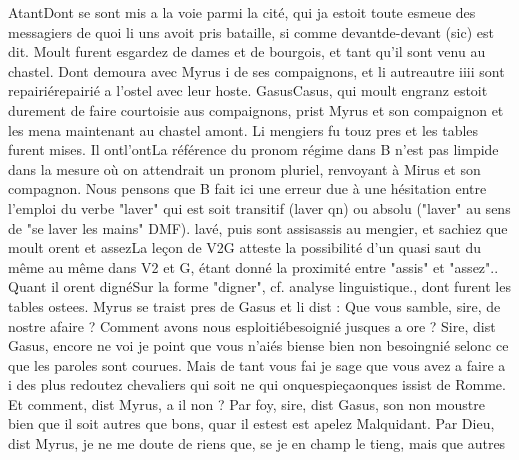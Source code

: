 \documentclass{article}
\begin{document}
\begin{pages}
                  AtantDont se sont mis a la voie parmi la
                  cité, qui ja estoit toute esmeue des messagiers de quoi li uns avoit pris
               bataille, si comme 
                     devantde-devant (sic) est dit. Moult furent esgardez de dames et de bourgois,
               et tant qu’il sont venu au chastel. Dont demoura avec Myrus
               i de ses compaignons, et li 
                  autreautre iiii sont 
                  repairiérepairié a l'ostel avec leur hoste. \pend
            \pstart 
                  GasusCasus, qui moult engranz estoit 
                  durement de faire courtoisie aus compaignons, prist Myrus et son compaignon et les
               mena 
                  maintenant au chastel amont. Li mengiers fu touz
               pres et les tables 
                  furent mises. Il 
                  ontl'ontLa référence du pronom régime dans B n'est pas
                  limpide dans la mesure où on attendrait un pronom pluriel, renvoyant à Mirus et
                  son compagnon. Nous pensons que B fait ici une erreur due à une hésitation entre
                  l'emploi du verbe "laver" qui est soit transitif (laver qn) ou absolu ("laver" au
                  sens de "se laver les mains" DMF). lavé, puis sont 
                  assisassis au mengier, et sachiez que moult orent et assezLa leçon de V2G atteste la possibilité d'un quasi
                  saut du même au même dans V2 et G, étant donné la proximité entre "assis" et
                  "assez".. Quant il orent dignéSur la forme
                  "digner", cf. analyse linguistique.,
                   dont furent les tables ostees. Myrus se traist pres de Gasus et 
                  li dist : Que vous samble, 
                     sire, de nostre afaire ? Comment avons nous 
                     esploitiébesoignié jusques a ore ?
               Sire, dist Gasus,
                  encore ne voi je point que vous 
                     n’aiés biense bien non besoingnié selonc ce que les paroles sont courues. Mais de tant vous fai je
                  sage que vous avez a faire a i des plus redoutez chevaliers qui 
                     soit ne qui onquespieçaonques issist de Romme.
               Et comment, dist Myrus, a il non ?
               Par foy, 
                     sire, dist Gasus, son non moustre bien que il
                  soit autres que bons, quar il 
                     estest est apelez Malquidant.
               Par Dieu, dist Myrus, je ne me doute de riens que, se je en champ le tieng, mais
                  que autres 


\end{pages}
\end{document}
